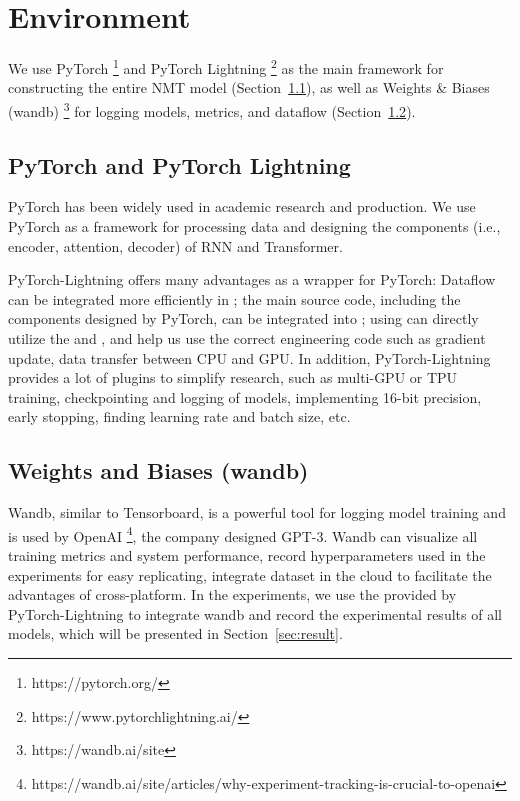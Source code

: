 \section{Environment} \label{sec:environment}

We use PyTorch \footnote{https://pytorch.org/} and PyTorch Lightning \footnote{https://www.pytorchlightning.ai/} \cite{falcon2019pytorch}  as the main framework for constructing the entire NMT model (Section~\ref{sec:lightning}), as well as Weights \& Biases (wandb) \footnote{https://wandb.ai/site} \cite{wandb} for logging models, metrics, and dataflow (Section~\ref{sec:wandb}).

\subsection{PyTorch and PyTorch Lightning} \label{sec:lightning}

PyTorch has been widely used in academic research and production. We use PyTorch as a framework for processing data and designing the components (i.e., encoder, attention, decoder) of RNN and Transformer.

PyTorch-Lightning offers many advantages as a wrapper for PyTorch: Dataflow can be integrated more efficiently in ; the main source code, including the components designed by PyTorch, can be integrated into ; using  can directly utilize the  and , and help us use the correct engineering code such as gradient update, data transfer between CPU and GPU. In addition, PyTorch-Lightning provides a lot of plugins to simplify research, such as multi-GPU or TPU training, checkpointing and logging of models, implementing 16-bit precision, early stopping, finding learning rate and batch size, etc.

\subsection{Weights and Biases (wandb)} \label{sec:wandb}

Wandb, similar to Tensorboard, is a powerful tool for logging model training and is used by OpenAI \footnote{https://wandb.ai/site/articles/why-experiment-tracking-is-crucial-to-openai}, the company designed GPT-3. Wandb can visualize all training metrics and system performance, record hyperparameters used in the experiments for easy replicating, integrate dataset in the cloud to facilitate the advantages of cross-platform. In the experiments, we use the  provided by PyTorch-Lightning to integrate wandb and record the experimental results of all models, which will be presented in Section~\ref{sec:result}.

